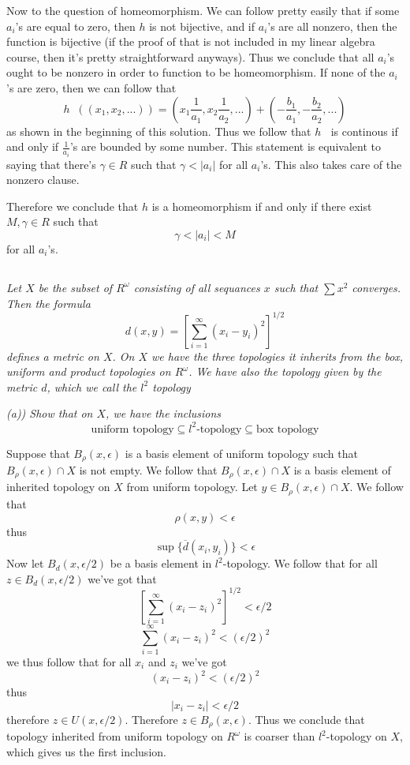 \documentclass[11pt,oneside,titlepage]{book}
\DeclareMathOperator \inv {^{-1}}
\newcommand{\set}[1]{\{ #1 \}}
\begin{document}
Now to the question of homeomorphism. We can follow pretty easily that if some  $a_i$'s are
equal to zero, then $h$ is not bijective, and if $a_i$'s are all nonzero, then the function
is bijective (if the proof of that is not included in my linear algebra course, then it's
pretty straightforward anyways). Thus we conclude that all $a_i$'s ought to be nonzero
in order to function to be homeomorphism. If none of the $a_i$'s are zero, then we can follow that
$$h\inv((x_1, x_2, ...)) = 
( x_1 \frac{1}{a_1}, x_2 \frac{1}{a_2}, ...) + (- \frac{b_1}{a_1}, - \frac{b_2}{a_2}, ...)$$
as shown in the beginning of this solution. Thus we follow that $h\inv$ is continous if
and only if $\frac{1}{a_i}$'s are bounded by some  number. This statement is equivalent
to saying that there's $\gamma \in R$ such that $\gamma < |a_i|$ for all $a_i$'s.
This also takes care of the nonzero clause.

Therefore we conclude that $h$ is a homeomorphism if and only if there
exist $M, \gamma \in R$ such that
$$\gamma < |a_i| < M$$
for all $a_i$'s.

\subsection{}

\textit{Let $X$ be the subset of $R^\omega$ consisting of all sequances $x$ such that $\sum{x^2}$
  converges. Then the formula
  $$d(x, y) = \left[\sum_{i = 1}^{\infty}{(x_i - y_i)^2}\right]^{1/2}$$
  defines a metric on $X$. On $X$ we have the three topologies it inherits from the box,
  uniform and product topologies on $R^\omega$. We have also the topology given by the metric $d$,
  which we call the $l^2$ topology}

\textit{(a)) Show that on $X$, we have the inclusions
$$ \text{uniform topology} \subseteq l^2\text{-topology} \subseteq \text{box topology}$$}

Suppose that $B_\rho(x, \epsilon)$ is a basis element of uniform topology such that
$B_\rho(x, \epsilon) \cap X$ is not empty. We follow that $B_\rho(x, \epsilon) \cap X$ is a
basis element of inherited topology on $X$ from uniform topology. Let
$y \in B_\rho(x, \epsilon) \cap X$. We follow that
$$\rho(x, y) < \epsilon$$
thus
$$\sup\set{\overline{d}(x_i, y_i)} < \epsilon$$
Now let $B_d(x, \epsilon/2)$ be a basis element in $l^2$-topology. We follow that for all
$z \in B_d(x, \epsilon/2)$ we've got that
$$\left[\sum_{i = 1}^{\infty}{(x_i - z_i)^2}\right]^{1/2} < \epsilon/2$$
$$\sum_{i = 1}^{\infty}{(x_i - z_i)^2} < (\epsilon/2)^2$$
we thus follow that for all $x_i$ and $z_i$ we've got
$$(x_i - z_i)^2 < (\epsilon/2)^2$$
thus
$$|x_i - z_i| < \epsilon/2$$
therefore $z \in U(x, \epsilon/2)$. Therefore $z \in B_\rho(x, \epsilon)$. Thus we conclude that
topology inherited from uniform topology on $R^\omega$ is coarser than $l^2$-topology on $X$,
which gives us the first inclusion.
\end{document}

